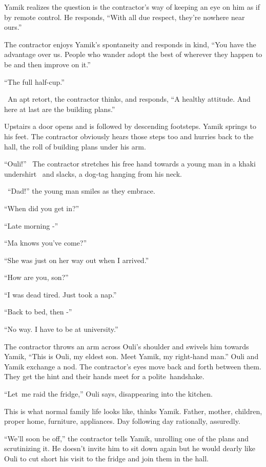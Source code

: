 \documentclass[twoside,11pt]{book}
\begin{document}
Yamik realizes the question is the contractor's way of keeping an eye on him as if by remote control. He responds,
``With all due respect, they're nowhere near ours.''

The contractor enjoys Yamik's spontaneity and responds in kind, ``You have the advantage over us. People
who wander adopt the best of wherever they happen to be and then improve on it.''

``The full half-cup.''

~An apt retort, the contractor thinks, and responds, ``A healthy attitude. And here at last are the
building plans.''

Upstairs a door opens and is followed by descending footsteps. Yamik springs to his feet. The contractor obviously hears
those steps too and hurries back to the hall, the roll of building plans under his arm.

``Ouli!'' \ The contractor stretches his free hand towards a young man in a khaki undershirt
{\ }and slacks,{ }a dog-tag hanging from his neck.

~``Dad!'' the young man smiles as they embrace.

``When did you get in?''

``Late morning -''

``Ma knows you've come?''

``She was just on her way out when I arrived.''

``How are you, son?''

``I was dead tired. Just took a nap.''

``Back to bed, then -''

``No way. I have to be at university.''

The contractor throws an arm across Ouli's shoulder and swivels him towards Yamik, ``This is Ouli, my
eldest son. Meet Yamik, my right-hand man.'' Ouli and Yamik exchange a nod. The contractor's eyes move
back and forth between them. They get the hint and their hands meet for a polite~handshake.

``Let~me raid the fridge,'' Ouli says, disappearing into the kitchen.

This is what normal family life looks like, thinks Yamik. Father, mother, children, proper home, furniture, appliances.
Day following day rationally, assuredly.

``We'll soon be off,'' the contractor tells Yamik, unrolling one of the plans and scrutinizing
it. He doesn't invite him to sit down again but he would dearly like Ouli to cut short his visit to the fridge and join
them in the hall.
\end{document}
